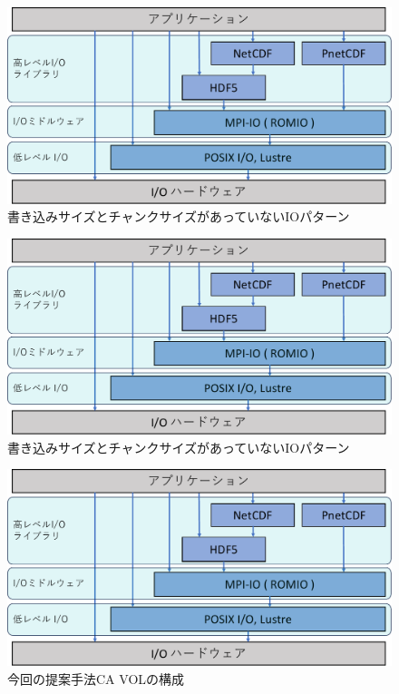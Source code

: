 \documentclass[submit,techrep,noauthor]{ipsj}
\begin{document}
\begin{figure}[t]
	\centering
	\includegraphics[page=14,width=\linewidth]{figure-crop.pdf}
	\caption{書き込みサイズとチャンクサイズがあっていないIOパターン}
	\label{fig:wrongio}
\end{figure}

\begin{figure}[t]
	\centering
	\includegraphics[page=15,width=\linewidth]{figure-crop.pdf}
	\caption{書き込みサイズとチャンクサイズがあっていないIOパターン}
	\label{fig:correctio}
\end{figure}

\begin{figure}[t]
	\centering
	\includegraphics[page=8,width=\linewidth]{figure-crop.pdf}
	\caption{今回の提案手法CA VOLの構成}
	\label{fig:dividevol}
\end{figure}
\end{document}
